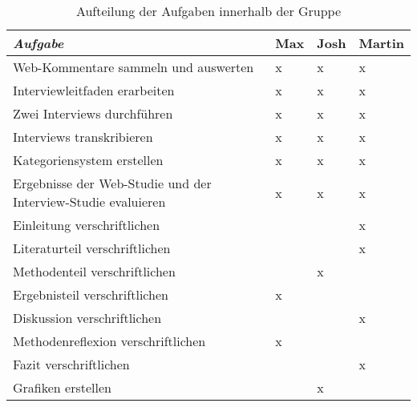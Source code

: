\begin{table}[]
    \centering
    \caption{Aufteilung der Aufgaben innerhalb der Gruppe}
    \begin{tabular}{@{}llll@{}}
    \toprule
    \textit{Aufgabe}                                              & \textbf{Max} & \textbf{Josh} & \textbf{Martin} \\ \midrule
    Web-Kommentare sammeln und auswerten                          & x            & x             & x               \\
    Interviewleitfaden erarbeiten                                 & x            & x             & x               \\
    Zwei Interviews durchführen                                   & x            & x             & x               \\
    Interviews transkribieren                                     & x            & x             & x               \\
    Kategoriensystem erstellen                                    & x            & x             & x               \\
    Ergebnisse der Web-Studie und der Interview-Studie evaluieren & x            & x             & x               \\
    Einleitung verschriftlichen                                   &              &               & x               \\
    Literaturteil verschriftlichen                                &              &               & x               \\
    Methodenteil verschriftlichen                                 &              & x             &                 \\
    Ergebnisteil verschriftlichen                                 & x            &               &                 \\
    Diskussion verschriftlichen                                   &              &               & x               \\
    Methodenreflexion verschriftlichen                            & x            &               &                 \\
    Fazit verschriftlichen                                        &              &               & x               \\
    Grafiken erstellen                                            &              & x             &                 \\ \bottomrule
    \end{tabular}
    \end{table}